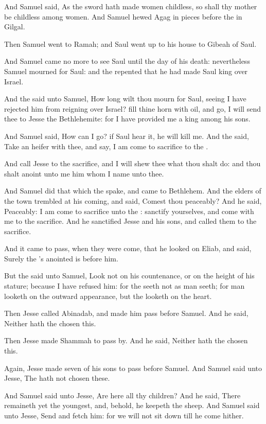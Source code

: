 \Verse And Samuel said, As the sword hath made women childless, so shall thy mother be childless among women. And Samuel hewed Agag in pieces before the \LORD in Gilgal.

\Verse Then Samuel went to Ramah; and Saul went up to his house to Gibeah of Saul.

\Verse And Samuel came no more to see Saul until the day of his death: nevertheless Samuel mourned for Saul: and the \LORD repented that he had made Saul king over Israel.


\Chapter
\Verse And the \LORD said unto Samuel, How long wilt thou mourn for Saul, seeing I have rejected him from reigning over Israel? fill thine horn with oil, and go, I will send thee to Jesse the Bethlehemite: for I have provided me a king among his sons.

\Verse And Samuel said, How can I go? if Saul hear it, he will kill me.  And the \LORD said, Take an heifer with thee, and say, I am come to sacrifice to the \LORD.

\Verse And call Jesse to the sacrifice, and I will shew thee what thou shalt do: and thou shalt anoint unto me him whom I name unto thee.

\Verse And Samuel did that which the \LORD spake, and came to Bethlehem.  And the elders of the town trembled at his coming, and said, Comest thou peaceably?  \Verse And he said, Peaceably: I am come to sacrifice unto the \LORD: sanctify yourselves, and come with me to the sacrifice.  And he sanctified Jesse and his sons, and called them to the sacrifice.

\Verse And it came to pass, when they were come, that he looked on Eliab, and said, Surely the \LORD's anointed is before him.

\Verse But the \LORD said unto Samuel, Look not on his countenance, or on the height of his stature; because I have refused him: for the \LORD seeth not as man seeth; for man looketh on the outward appearance, but the \LORD looketh on the heart.

\Verse Then Jesse called Abinadab, and made him pass before Samuel. And he said, Neither hath the \LORD chosen this.

\Verse Then Jesse made Shammah to pass by. And he said, Neither hath the \LORD chosen this.

\Verse Again, Jesse made seven of his sons to pass before Samuel. And Samuel said unto Jesse, The \LORD hath not chosen these.

\Verse And Samuel said unto Jesse, Are here all thy children? And he said, There remaineth yet the youngest, and, behold, he keepeth the sheep. And Samuel said unto Jesse, Send and fetch him: for we will not sit down till he come hither.

